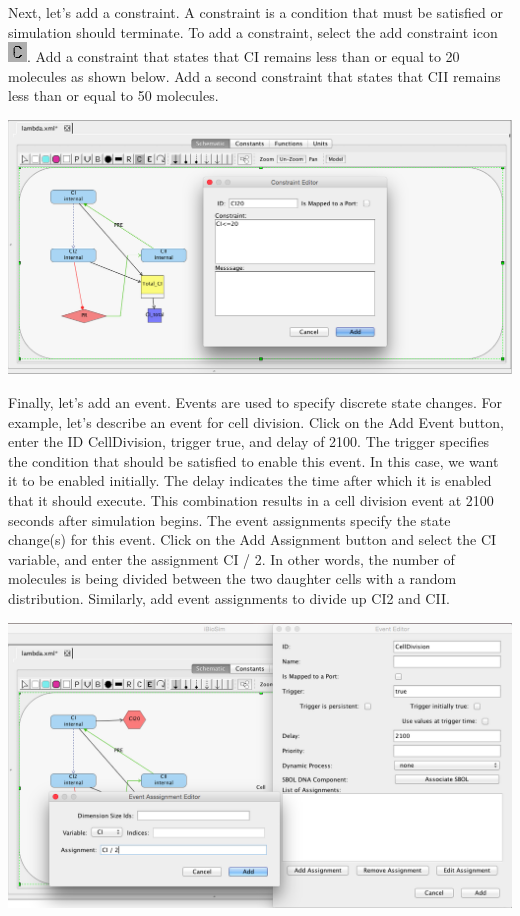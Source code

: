 \documentclass[titlepage,11pt]{article}
\begin{document}
Next, let's add a constraint.  A constraint is a condition that must be satisfied or simulation should terminate.  To add a constraint, select the add constraint icon
\includegraphics{../gui/icons/modelview/constraint_mode_selected}.  Add a constraint that states that CI remains less than or equal to 20 molecules as shown below.  Add a second constraint that states that CII remains less than or equal to 50 molecules.

\begin{center}
\includegraphics[width=160mm]{screenshots/constraint}
\end{center}

Finally, let's add an event.  Events are used to specify discrete state changes.  For example, let's describe an event for cell division.  Click on the Add Event button, enter the ID CellDivision, trigger true, and delay of 2100.  The trigger specifies the condition that should be satisfied to enable this event.  In this case, we want it to be enabled initially.  The delay indicates the time after which it is enabled that it should execute. This combination results in a cell division event at 2100 seconds after simulation begins.  The event assignments specify the state change(s) for this event.  Click on the Add Assignment button and select the CI variable, and enter the assignment CI / 2.  In other words, the number of molecules is being divided between the two daughter cells with a random distribution.  Similarly, add event assignments to divide up CI2 and CII.

\begin{center}
\includegraphics[width=160mm]{screenshots/event}
\end{center}
\end{document}
